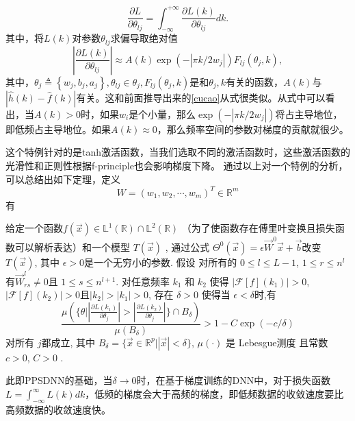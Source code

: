 \begin{equation}
    \frac{\partial L}{\partial\theta_{lj}}=\int_{-\infty}^{+\infty}\frac{\partial L(k)}{\partial\theta_{lj}}dk.\label{eq:GDfreq}
\end{equation}
其中，将$L(k)$对参数$\theta_{lj}$求偏导取绝对值
\begin{equation}
    \left|\frac{\partial L(k)}{\partial\theta_{lj}}\right|\approx A(k)\exp\left(-|\pi k/2w_{j}|\right)F_{lj}(\theta_{j},k),\label{eq:DL2}
\end{equation}
其中，$\theta_{j} \triangleq\left\{w_{j}, b_{j}, a_{j}\right\}, \theta_{l j} \in \theta_{j}, F_{l j}\left(\theta_{j}, k\right)$是和$\theta_{j}, k$有关的函数，$A(k)$与$|\hat{h}(k)-\hat{f}(k)|$有关。这和前面推导出来的\ref{cucao}从式很类似。从式中可以看出，当$A(k)>0$时，如果$w_{i}$是个小量，那么$\exp\left(-|\pi k/2w_{j}|\right)$将占主导地位，即低频占主导地位。如果$A(k)\approx 0$，那么频率空间的参数对梯度的贡献就很少。

这个特例针对的是tanh激活函数，当我们选取不同的激活函数时，这些激活函数的光滑性和正则性根据f-principle也会影响梯度下降。
通过以上对一个特例的分析，可以总结出如下定理，定义
\begin{equation}
    W=\left(w_{1}, w_{2}, \cdots, w_{m}\right)^{T} \in \mathbb{R}^{m}
\end{equation}
有
\begin{thm}
给定一个函数$f(\vec{x})\in\mathbb{L}^{1}(\mathbb{R})\cap\mathbb{L}%
^{2}(\mathbb{R})$ （为了使函数存在傅里叶变换且损失函数可以解析表达）和一个模型 $T(\vec{x})$ , 通过公式 $\Theta^{0}(\vec{x})=\epsilon
\vec{W}^{0}\vec{x}+\vec{b}$改变 $T(\vec{x})$, 其中 $\epsilon>0$是一个无穷小的参数. 假设
 对所有的 $0\leqslant l\leqslant L-1$, $1\leqslant
r\leqslant n^{l}$ 有$\vec{W}_{rs}^{l}\neq0$且 $1\leqslant s\leqslant n^{l+1}$. 对任意频率  
$k_{1}$ 和 $k_{2}$ 使得 $\left|  \mathcal{F}[f](k_{1}) \right|  >0$,
$\left|  \mathcal{F}[f](k_{2}) \right|  >0$且$\left|  k_{2} \right|
>\left|  k_{1} \right|  >0$, 存在 $\delta>0$ 使得当
$\epsilon<\delta$时,有
\[
\frac{\mu\left(  \{\theta|\left|  \frac{\partial L(k_{1})}{\partial\theta_{j}}
\right|  >\left|  \frac{\partial L(k_{2})}{\partial\theta_{j}} \right|  \}\cap
B_{\delta}\right)  }{\mu(B_{\delta})}>1-C\exp(-c/\delta)
\]
对所有 $j$都成立, 其中 $B_{\delta}=\{\vec{x}\in\mathbb{R}^{p}|\left|
\vec{x} \right|  <\delta\}$, $\mu(\cdot)$ 是 Lebesgue测度 且常数 $c>0$,
$C>0$ .
\end{thm}

此即PPSDNN的基础，当$\delta \rightarrow 0$时，在基于梯度训练的DNN中，对于损失函数$L = \int_{-\infty }^{\infty } L(k)dk$，低频的梯度会大于高频的梯度，即低频数据的收敛速度要比高频数据的收敛速度快。

